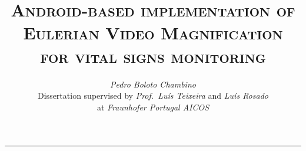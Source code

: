 \documentclass[9pt,a4paper]{extarticle}
\begin{document}
\title{\vspace*{-8mm}\textbf{\textsc{Android-based implementation of Eulerian Video Magnification\\for vital signs monitoring}}}
\author{\emph{Pedro Boloto Chambino}\\[2mm]
\small{Dissertation supervised by \emph{Prof.\ Luís Teixeira} and \emph{Luís Rosado}}\\
\small{at \emph{Fraunhofer Portugal AICOS}}}
\date{}
\maketitle
\thispagestyle{empty}

\vspace*{-4mm}\noindent\rule{\textwidth}{0.4pt}\vspace*{4mm}

\newcommand{\evm}{Eulerian Video Magnification}
\end{document}

